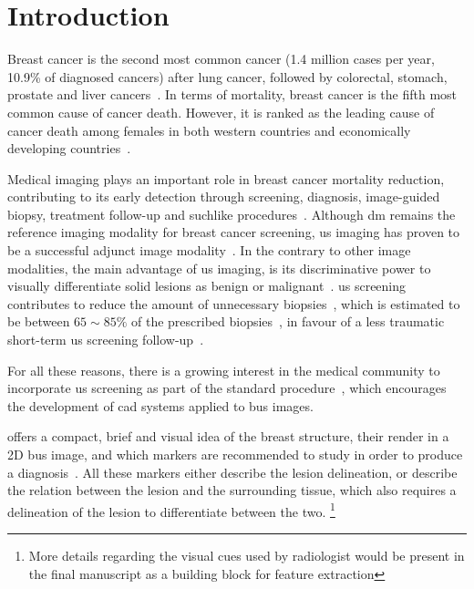 \graphicspath{ {./content/intro/figures/} }

\section{Introduction}
\label{sec:intro}  %


Breast cancer is the second most common cancer (1.4 million cases per year, 10.9\% of  diagnosed cancers) after lung cancer, followed by colorectal, stomach, prostate and liver cancers~\cite{Ferlay2010}.
In terms of mortality, breast cancer is the fifth most common cause of cancer death.
However, it is ranked as the leading cause of cancer death among females in both western countries and economically developing countries~\cite{cancerStatistics2011}.

Medical imaging plays an important role in breast cancer mortality reduction, contributing to its early detection through screening, diagnosis, image-guided biopsy, treatment follow-up and suchlike procedures~\cite{smith2003american}.
Although \ac{dm} remains the reference imaging modality for breast cancer screening, \ac{us} imaging has proven to be a successful adjunct image modality~\cite{smith2003american,berg2004diagnostic}.
In the contrary to other image modalities, the main advantage of \ac{us} imaging, is its discriminative power to visually differentiate solid lesions as benign or malignant~\cite{Stavros:1995p12392}.
\Ac{us} screening contributes to reduce the amount of unnecessary biopsies~\cite{ciatto1994contribution}, which is estimated to be between $65\sim85\%$ of the prescribed biopsies~\cite{yuan2010multimodality}, in favour of a less traumatic short-term \ac{us} screening follow-up~\cite{gordon1995malignant}.

 For all these reasons, there is a growing interest in the medical community to incorporate \ac{us} screening as part of the standard procedure~\cite{biradsus}, which encourages the development of \ac{cad} systems applied to \ac{bus} images.

 offers a compact, brief and visual idea of the breast structure, their render in a 2D \ac{bus} image, and which markers are recommended to study in order to produce a diagnosis~\cite{biradsus}.
All these markers either describe the lesion delineation, or describe the relation between the lesion and the surrounding tissue, which also requires a delineation of the lesion to differentiate between the two.
\footnote{More details regarding the visual cues used by radiologist would be present in the final manuscript as a building block for feature extraction}


